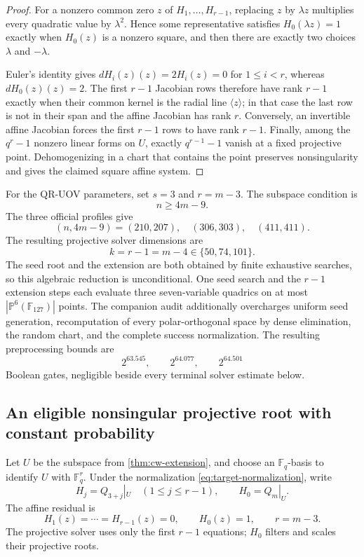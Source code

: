 \documentclass[11pt,a4paper]{article}
\theoremstyle{definition}
\theoremstyle{remark}
\newcommand{\F}{\mathbb F}
\newcommand{\PP}{\mathbb P}
\begin{document}
\begin{proof}
For a nonzero common zero $z$ of $H_1,\ldots,H_{r-1}$, replacing $z$ by
$\lambda z$ multiplies every quadratic value by $\lambda^2$.  Hence some
representative satisfies $H_0(\lambda z)=1$ exactly when $H_0(z)$ is a nonzero
square, and then there are exactly two choices $\lambda$ and $-\lambda$.

Euler's identity gives $dH_i(z)(z)=2H_i(z)=0$ for $1\le i<r$, whereas
$dH_0(z)(z)=2$.  The first $r-1$ Jacobian rows therefore have rank $r-1$
exactly when their common kernel is the radial line $\langle z\rangle$; in
that case the last row is not in their span and the affine Jacobian has rank
$r$.  Conversely, an invertible affine Jacobian forces the first $r-1$ rows
to have rank $r-1$.  Finally, among the $q^r-1$ nonzero linear forms on $U$,
exactly $q^{r-1}-1$ vanish at a fixed projective point.  Dehomogenizing in a
chart that contains the point preserves nonsingularity and gives the claimed
square affine system.
\end{proof}

For the QR-UOV parameters, set $s=3$ and $r=m-3$.  The subspace condition is
\begin{equation}\label{eq:official-cw-condition}
 n\ge4m-9.
\end{equation}
The three official profiles give
\[
 (n,4m-9)=(210,207),\quad(306,303),\quad(411,411).
\]
The resulting projective solver dimensions are
\begin{equation}\label{eq:official-projective-cores}
 k=r-1=m-4\in\{50,74,101\}.
\end{equation}
The seed root and the extension are both obtained by finite exhaustive
searches, so this algebraic reduction is unconditional.  One seed search and
the $r-1$ extension steps each evaluate three seven-variable quadrics on at
most $|\PP^6(\F_{127})|$ points.  The companion audit additionally overcharges
uniform seed generation, recomputation of every polar-orthogonal space by
dense elimination, the random chart, and the complete success normalization.
The resulting preprocessing bounds are
\[
 2^{63.545},\qquad2^{64.077},\qquad2^{64.501}
\]
Boolean gates, negligible beside every terminal solver estimate below.

\subsection{An eligible nonsingular projective root with constant probability}

Let $U$ be the subspace from \cref{thm:cw-extension}, and choose an $\F_q$-basis
to identify $U$ with $\F_q^r$.  Under the normalization
\eqref{eq:target-normalization}, write
\[
 H_j=Q_{3+j}|_U\quad(1\le j\le r-1),
 \qquad H_0=Q_m|_U.
\]
The affine residual is
\begin{equation}\label{eq:direct-residual}
 H_1(z)=\cdots=H_{r-1}(z)=0,
 \qquad H_0(z)=1,
 \qquad r=m-3.
\end{equation}
The projective solver uses only the first $r-1$ equations; $H_0$ filters and
scales their projective roots.
\end{document}
